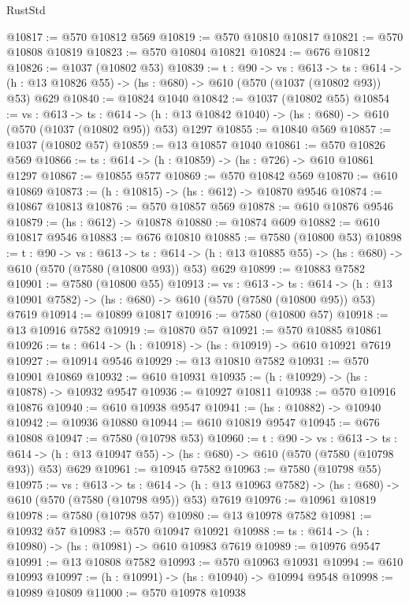 \begin{lexlean}{RustStd}
\begin{coremodule}
@10817 := @570 @10812 @569
@10819 := @570 @10810 @10817
@10821 := @570 @10808 @10819
@10823 := @570 @10804 @10821
@10824 := @676 @10812
@10826 := @1037 (@10802 @53)
@10839 := {t : @90} ->
  {vs : @613} ->
  {ts : @614} -> (h : @13 @10826 @55) -> (hs : @680) -> @610 (@570 (@1037 (@10802 @93)) @53) @629
@10840 := @10824 @1040
@10842 := @1037 (@10802 @55)
@10854 := {vs : @613} ->
  {ts : @614} -> (h : @13 @10842 @1040) -> (hs : @680) -> @610 (@570 (@1037 (@10802 @95)) @53) @1297
@10855 := @10840 @569
@10857 := @1037 (@10802 @57)
@10859 := @13 @10857 @1040
@10861 := @570 @10826 @569
@10866 := {ts : @614} -> (h : @10859) -> (hs : @726) -> @610 @10861 @1297
@10867 := @10855 @577
@10869 := @570 @10842 @569
@10870 := @610 @10869
@10873 := (h : @10815) -> (hs : @612) -> @10870 @9546
@10874 := @10867 @10813
@10876 := @570 @10857 @569
@10878 := @610 @10876 @9546
@10879 := (hs : @612) -> @10878
@10880 := @10874 @609
@10882 := @610 @10817 @9546
@10883 := @676 @10810
@10885 := @7580 (@10800 @53)
@10898 := {t : @90} ->
  {vs : @613} ->
  {ts : @614} -> (h : @13 @10885 @55) -> (hs : @680) -> @610 (@570 (@7580 (@10800 @93)) @53) @629
@10899 := @10883 @7582
@10901 := @7580 (@10800 @55)
@10913 := {vs : @613} ->
  {ts : @614} -> (h : @13 @10901 @7582) -> (hs : @680) -> @610 (@570 (@7580 (@10800 @95)) @53) @7619
@10914 := @10899 @10817
@10916 := @7580 (@10800 @57)
@10918 := @13 @10916 @7582
@10919 := @10870 @57
@10921 := @570 @10885 @10861
@10926 := {ts : @614} -> (h : @10918) -> (hs : @10919) -> @610 @10921 @7619
@10927 := @10914 @9546
@10929 := @13 @10810 @7582
@10931 := @570 @10901 @10869
@10932 := @610 @10931
@10935 := (h : @10929) -> (hs : @10878) -> @10932 @9547
@10936 := @10927 @10811
@10938 := @570 @10916 @10876
@10940 := @610 @10938 @9547
@10941 := (hs : @10882) -> @10940
@10942 := @10936 @10880
@10944 := @610 @10819 @9547
@10945 := @676 @10808
@10947 := @7580 (@10798 @53)
@10960 := {t : @90} ->
  {vs : @613} ->
  {ts : @614} -> (h : @13 @10947 @55) -> (hs : @680) -> @610 (@570 (@7580 (@10798 @93)) @53) @629
@10961 := @10945 @7582
@10963 := @7580 (@10798 @55)
@10975 := {vs : @613} ->
  {ts : @614} -> (h : @13 @10963 @7582) -> (hs : @680) -> @610 (@570 (@7580 (@10798 @95)) @53) @7619
@10976 := @10961 @10819
@10978 := @7580 (@10798 @57)
@10980 := @13 @10978 @7582
@10981 := @10932 @57
@10983 := @570 @10947 @10921
@10988 := {ts : @614} -> (h : @10980) -> (hs : @10981) -> @610 @10983 @7619
@10989 := @10976 @9547
@10991 := @13 @10808 @7582
@10993 := @570 @10963 @10931
@10994 := @610 @10993
@10997 := (h : @10991) -> (hs : @10940) -> @10994 @9548
@10998 := @10989 @10809
@11000 := @570 @10978 @10938

\end{coremodule}
\end{lexlean}
